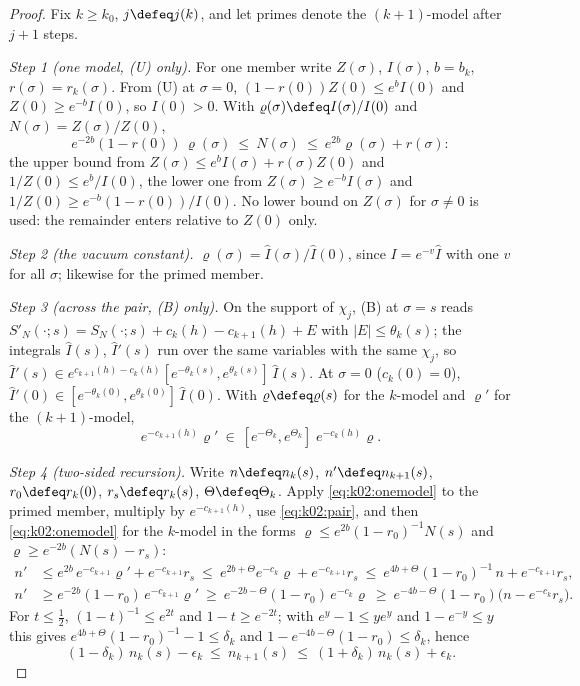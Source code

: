 \begin{proof}
Fix $k\ge k_0$, $j\defeq j(k)$, and let primes denote the $(k+1)$-model after $j+1$ steps.

\emph{Step 1 (one model, \textup{(U)} only).} For one member write $Z(\sigma)$, $I(\sigma)$, $b=b_k$, $r(\sigma)=r_k(\sigma)$. From (U) at $\sigma=0$, $(1-r(0))Z(0)\le e^{b}I(0)$ and $Z(0)\ge e^{-b}I(0)$, so $I(0)>0$. With $\varrho(\sigma)\defeq I(\sigma)/I(0)$ and $N(\sigma)=Z(\sigma)/Z(0)$,
\begin{equation}\label{eq:k02:onemodel}
e^{-2b}(1-r(0))\,\varrho(\sigma)\ \le\ N(\sigma)\ \le\ e^{2b}\varrho(\sigma)+r(\sigma):
\end{equation}
the upper bound from $Z(\sigma)\le e^{b}I(\sigma)+r(\sigma)Z(0)$ and $1/Z(0)\le e^{b}/I(0)$, the lower one from $Z(\sigma)\ge e^{-b}I(\sigma)$ and $1/Z(0)\ge e^{-b}(1-r(0))/I(0)$. No lower bound on $Z(\sigma)$ for $\sigma\ne0$ is used: the remainder enters relative to $Z(0)$ only.

\emph{Step 2 (the vacuum constant).} $\varrho(\sigma)=\hat I(\sigma)/\hat I(0)$, since $I=e^{-v}\hat I$ with one $v$ for all $\sigma$; likewise for the primed member.

\emph{Step 3 (across the pair, \textup{(B)} only).} On the support of $\chi_j$, (B) at $\sigma=s$ reads $S'_N(\cdot;s)=S_N(\cdot;s)+c_k(h)-c_{k+1}(h)+E$ with $|E|\le\theta_k(s)$; the integrals $\hat I(s)$, $\hat I'(s)$ run over the same variables with the same $\chi_j$, so $\hat I'(s)\in e^{c_{k+1}(h)-c_k(h)}[e^{-\theta_k(s)},e^{\theta_k(s)}]\,\hat I(s)$. At $\sigma=0$ ($c_k(0)=0$), $\hat I'(0)\in[e^{-\theta_k(0)},e^{\theta_k(0)}]\,\hat I(0)$. With $\varrho\defeq\varrho(s)$ for the $k$-model and $\varrho'$ for the $(k+1)$-model,
\begin{equation}\label{eq:k02:pair}
e^{-c_{k+1}(h)}\varrho'\ \in\ [e^{-\Theta_k},e^{\Theta_k}]\;e^{-c_k(h)}\varrho .
\end{equation}

\emph{Step 4 (two-sided recursion).} Write $n\defeq n_k(s)$, $n'\defeq n_{k+1}(s)$, $r_0\defeq r_k(0)$, $r_s\defeq r_k(s)$, $\Theta\defeq\Theta_k$. Apply \eqref{eq:k02:onemodel} to the primed member, multiply by $e^{-c_{k+1}(h)}$, use \eqref{eq:k02:pair}, and then \eqref{eq:k02:onemodel} for the $k$-model in the forms $\varrho\le e^{2b}(1-r_0)^{-1}N(s)$ and $\varrho\ge e^{-2b}(N(s)-r_s)$:
\begin{align*}
n'&\le e^{2b}\,e^{-c_{k+1}}\varrho'+e^{-c_{k+1}}r_s\ \le\ e^{2b+\Theta}e^{-c_k}\varrho+e^{-c_{k+1}}r_s\ \le\ e^{4b+\Theta}(1-r_0)^{-1}\,n+e^{-c_{k+1}}r_s,\\
n'&\ge e^{-2b}(1-r_0)\,e^{-c_{k+1}}\varrho'\ \ge\ e^{-2b-\Theta}(1-r_0)\,e^{-c_k}\varrho\ \ge\ e^{-4b-\Theta}(1-r_0)\big(n-e^{-c_k}r_s\big).
\end{align*}
For $t\le\frac12$, $(1-t)^{-1}\le e^{2t}$ and $1-t\ge e^{-2t}$; with $e^{y}-1\le ye^{y}$ and $1-e^{-y}\le y$ this gives $e^{4b+\Theta}(1-r_0)^{-1}-1\le\delta_k$ and $1-e^{-4b-\Theta}(1-r_0)\le\delta_k$, hence
\begin{equation}\label{eq:k02:rec}
(1-\delta_k)\,n_k(s)-\epsilon_k\ \le\ n_{k+1}(s)\ \le\ (1+\delta_k)\,n_k(s)+\epsilon_k .
\end{equation}


\end{proof}
